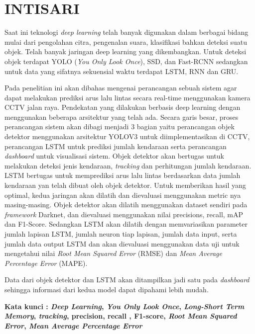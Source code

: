 \documentclass[../thesis.tex]{subfiles}
\begin{document}
\chapter*{INTISARI}%
\normalfont
\vspace{1.0cm}
\begin{singlespacing}%
{}

Saat ini teknologi \textit{deep learning} telah banyak digunakan dalam berbagai bidang mulai dari pengolahan citra, pengenalan suara, klasifikasi bahkan deteksi suatu objek. Telah banyak jaringan deep learning yang dikembangkan. Untuk deteksi objek terdapat
YOLO (\textit{You Only Look Once}), SSD, dan Fast-RCNN sedangkan untuk data yang sifatnya sekuensial waktu terdapat LSTM, RNN dan GRU. 

Pada penelitian ini akan dibahas mengenai perancangan sebuah sistem agar dapat melakukan prediksi arus lalu lintas secara real-time menggunakan kamera CCTV jalan raya. Pendekatan yang dilakukan berbasis deep learning dengan menggunakan beberapa arsitektur yang telah ada.
Secara garis besar, proses perancangan sistem akan dibagi menjadi 3 bagian yaitu perancangan objek detektor menggunakan arsitektur YOLOV3 untuk diimplementasikan di CCTV, perancangan LSTM untuk prediksi jumlah kendaraan serta perancangan \textit{dashboard} untuk visualisasi sistem.
Objek detektor akan bertugas untuk melakukan deteksi jenis kendaraan, \textit{tracking} dan perhitungan jumlah kendaraan. LSTM bertugas untuk memprediksi arus lalu lintas berdasarkan data jumlah kendaraan yan telah dibuat oleh objek detektor. Untuk memberikan hasil yang optimal, kedua jaringan akan dilatih dan dievaluasi menggunakan metric nya masing-masing. 
Objek detektor akan dilatih menggunakan dataset sendiri pada \textit{framework} Darknet, dan dievaluasi menggunakan nilai precisions, recall, mAP dan F1-Score. 
Sedangkan LSTM akan dilatih dengan memvariasikan parameter jumlah lapisan LSTM, jumlah neuron tiap lapisan, jumlah data input, serta jumlah data output LSTM dan akan dievaluasi menggunakan data uji untuk mengetahui nilai \textit{Root Mean Squared Error} (RMSE) dan \textit{Mean Average Percentage Error} (MAPE). 

Data dari objek detektor dan LSTM akan ditampilkan jadi satu pada \textit{dashboard} sehingga informasi dari kedua model dapat dipahami lebih mudah.

\bigskip
\noindent
\textbf{Kata kunci : \textit{Deep Learning}, \textit{You Only Look Once}, \textit{Long-Short Term Memory}, \textit{tracking}, precision, recall , F1-score, \textit{Root Mean Squared Error}, \textit{Mean Average Percentage Error } }
\end{singlespacing}
\end{document}
